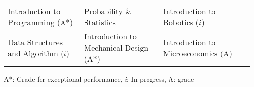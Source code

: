 
\begin{tabular*}{\textwidth}{l l l l}
  Introduction to Programming (A$*$) & Probability \& Statistics  & Introduction to Robotics ($i$) \\
  Data Structures and Algorithm ($i$) & Introduction to Mechanical Design (A$*$)& Introduction to Microeconomics (A) \\
\end{tabular*}
{\footnotesize
    {A$*$: Grade for exceptional performance, $i$: In progress, A: grade}
}
